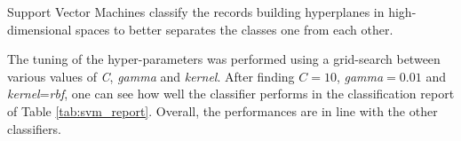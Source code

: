 \documentclass[10pt, a4paper, twocolumn]{article}
\begin{document}
Support Vector Machines classify the records building hyperplanes in high-dimensional spaces to better separates the classes one from each other.

The tuning of the hyper-parameters was performed using a grid-search between various values of \textit{C}, \textit{gamma} and \textit{kernel}. After finding $C=10$, \textit{gamma}$=0.01$ and  \textit{kernel}=\textit{rbf}, one can see how well the classifier performs in the classification report of Table \ref{tab:svm_report}. Overall, the performances are in line with the other classifiers.

\begin{table}
\centering
\caption{Classification report for SVM}
\label{tab:svm_report}
\end{table}
\end{document}
